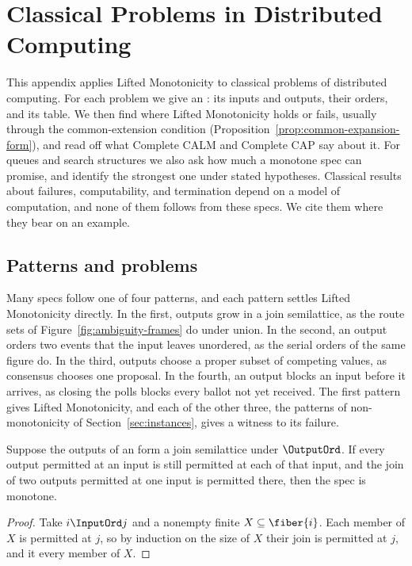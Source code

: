 \section{Classical Problems in Distributed Computing}
\label{app:additional-applications}

This appendix applies Lifted Monotonicity to classical problems of
distributed computing.  For each problem we give an \spectype: its inputs and
outputs, their orders, and its table.  We then find where Lifted Monotonicity
holds or fails, usually through the common-extension condition
(Proposition~\ref{prop:common-expansion-form}), and read off what Complete
CALM and Complete CAP say about it.  For queues and search structures we also
ask how much a monotone spec can promise, and identify the strongest one under
stated hypotheses.  Classical results about failures, computability, and
termination depend on a model of computation, and none of them follows from
these specs.  We cite them where they bear on an example.

\subsection{Patterns and problems}
\label{app:classical-patterns}

Many specs follow one of four patterns, and each pattern settles Lifted
Monotonicity directly.  In the first, outputs grow in a join semilattice, as
the route sets of Figure~\ref{fig:ambiguity-frames} do under union.  In the
second, an output orders two events that the input leaves unordered, as the
serial orders of the same figure do.  In the third, outputs choose a proper
subset of competing values, as consensus chooses one proposal.  In the fourth,
an output blocks an input before it arrives, as closing the polls blocks every
ballot not yet received.  The first pattern gives Lifted Monotonicity, and
each of the other three, the patterns of non-monotonicity of
Section~\ref{sec:instances}, gives a witness to its failure.

\begin{lemma}
\label{lem:accumulating}
Suppose the outputs of an \spectype form a join semilattice under
$\OutputOrd$.  If every output permitted at an input is still permitted at each
\indesc of that input, and the join of two outputs permitted at one input is
permitted there, then the spec is monotone.
\end{lemma}

\begin{proof}
Take $i\InputOrd j$ and a nonempty finite $X\subseteq\fiber{i}$.  Each member
of $X$ is permitted at $j$, so by induction on the size of $X$ their join is
permitted at $j$, and it \outrel every member of $X$.
\end{proof}

